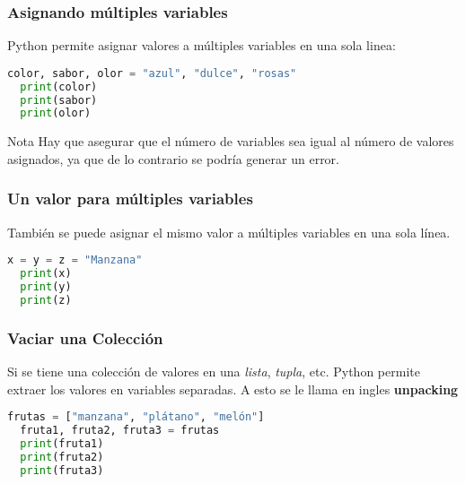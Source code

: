 \begin{frame}[fragile]
  \frametitle{Asignando múltiples variables}

  Python permite asignar valores a múltiples variables en una sola linea:

  \vspace{\baselineskip}
  \begin{lstlisting}[language=Python]
  color, sabor, olor = "azul", "dulce", "rosas"
  print(color)
  print(sabor)
  print(olor)
  \end{lstlisting}

  \begin{alertblock}{Nota}
    Hay que asegurar que el número de variables sea igual al número de valores
    asignados, ya que de lo contrario se podría generar un error.
  \end{alertblock}
\end{frame}

\begin{frame}[fragile]
  \frametitle{Un valor para múltiples variables}

  También se puede asignar el mismo valor a múltiples variables en una sola
  línea.

  \vspace{\baselineskip}
  \begin{lstlisting}[language=Python]
  x = y = z = "Manzana"
  print(x)
  print(y)
  print(z)
  \end{lstlisting}
\end{frame}

\begin{frame}[fragile]
  \frametitle{Vaciar una Colección}

  Si se tiene una colección de valores en una \textit{lista}, \textit{tupla},
  etc. Python permite extraer los valores en variables separadas. A esto
  se le llama en ingles \textbf{unpacking}

  \vspace{\baselineskip}
  \begin{lstlisting}[language=Python]
  frutas = ["manzana", "plátano", "melón"]
  fruta1, fruta2, fruta3 = frutas
  print(fruta1)
  print(fruta2)
  print(fruta3)
  \end{lstlisting}
\end{frame}

